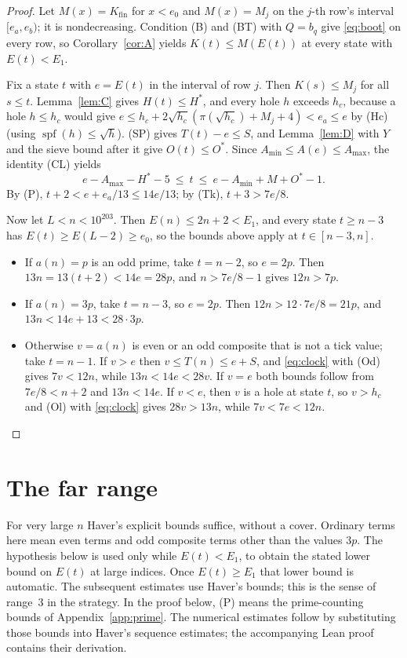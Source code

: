 \documentclass[11pt]{article}
\theoremstyle{definition}
\theoremstyle{remark}
\newcommand{\spf}{\operatorname{spf}}
\begin{document}
\begin{proof}
Let $M(x)=K_{\mathrm{fin}}$ for $x<e_0$ and $M(x)=M_j$ on the $j$-th row's
interval $[e_a,e_b)$; it is nondecreasing. Condition (B) and (BT) with
$Q=b_q$ give \eqref{eq:boot} on every row, so Corollary~\ref{cor:A} yields
$K(t)\le M(E(t))$ at every state with $E(t)<E_1$.

Fix a state $t$ with $e=E(t)$ in the interval of row $j$. Then
$K(s)\le M_j$ for all $s\le t$. Lemma~\ref{lem:C} gives $H(t)\le H^*$,
and every hole $h$ exceeds $h_c$, because a hole $h\le h_c$ would give
$e\le h_c+2\sqrt{h_c}(\pi(\sqrt{h_c})+M_j+4)<e_a\le e$ by (Hc) (using
$\spf(h)\le\sqrt h$). (SP) gives $T(t)-e\le S$, and Lemma~\ref{lem:D} with
$Y$ and the sieve bound after it give $O(t)\le O^*$. Since
$A_{\min}\le A(e)\le A_{\max}$, the identity (CL) yields
\begin{equation}\label{eq:clock}
 e-A_{\max}-H^*-5\ \le\ t\ \le\ e-A_{\min}+M+O^*-1 .
\end{equation}
By (P), $t+2<e+e_a/13\le14e/13$; by (Tk), $t+3>7e/8$.

Now let $L<n<10^{203}$. Then $E(n)\le2n+2<E_1$, and every state $t\ge n-3$
has $E(t)\ge E(L-2)\ge e_0$, so the bounds above apply at $t\in[n-3,n]$.
\begin{itemize}
\item If $a(n)=p$ is an odd prime, take $t=n-2$, so $e=2p$. Then
  $13n=13(t+2)<14e=28p$, and $n>7e/8-1$ gives $12n>7p$.
\item If $a(n)=3p$, take $t=n-3$, so $e=2p$. Then
  $12n>12\cdot7e/8=21p$, and $13n<14e+13<28\cdot3p$.
\item Otherwise $v=a(n)$ is even or an odd composite that is not a tick
  value; take $t=n-1$. If $v>e$ then $v\le T(n)\le e+S$, and \eqref{eq:clock}
  with (Od) gives $7v<12n$, while $13n<14e<28v$. If $v=e$ both bounds
  follow from $7e/8<n+2$ and $13n<14e$. If $v<e$, then $v$ is a hole at
  state $t$, so $v>h_c$ and (Ol) with \eqref{eq:clock} gives
  $28v>13n$, while $7v<7e<12n$.\qedhere
\end{itemize}
\end{proof}

\section{The far range}\label{sec:far}

For very large $n$ Haver's explicit bounds suffice, without a cover.
Ordinary terms here mean even terms and odd composite terms other than
the values $3p$. The hypothesis below is used only while $E(t)<E_1$,
to obtain the stated lower bound on $E(t)$ at large indices. Once
$E(t)\ge E_1$ that lower bound is automatic. The subsequent estimates
use Haver's bounds; this is the sense of range~3 in the strategy.
In the proof below, (P) means the prime-counting bounds of
Appendix~\ref{app:prime}. The numerical estimates follow by substituting
those bounds into Haver's sequence estimates; the accompanying Lean proof
contains their derivation.
\end{document}
